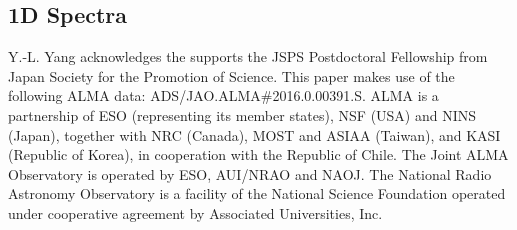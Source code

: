 \documentclass[twocolumn]{aastex62}
\newcommand{\methanol}{\mbox{CH$_{3}$OH}}
\begin{document}

\subsection{1D Spectra}

% 






% 

\acknowledgements
Y.-L. Yang acknowledges the supports the JSPS Postdoctoral Fellowship from Japan Society for the Promotion of Science.  This paper makes use of the following ALMA data: ADS/JAO.ALMA\#2016.0.00391.S. ALMA is a partnership of ESO (representing its member states), NSF (USA) and NINS (Japan), together with NRC (Canada), MOST and ASIAA (Taiwan), and KASI (Republic of Korea), in cooperation with the Republic of Chile. The Joint ALMA Observatory is operated by ESO, AUI/NRAO and NAOJ.  The National Radio Astronomy Observatory is a facility of the National Science Foundation operated under cooperative agreement by Associated Universities, Inc.
\end{document}

